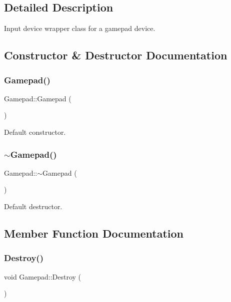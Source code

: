 \subsection{Detailed Description}
Input device wrapper class for a gamepad device. 

\subsection{Constructor \& Destructor Documentation}
\mbox{\label{class_gamepad_a766fe5c4b0971cd755f7c930ede3c068}} 
\subsubsection{\texorpdfstring{Gamepad()}{Gamepad()}}
{\footnotesize\ttfamily Gamepad\+::\+Gamepad (\begin{DoxyParamCaption}{ }\end{DoxyParamCaption})}

Default constructor. \mbox{\label{class_gamepad_a5d488c36c656a0f52787671b9b156822}} 
\subsubsection{\texorpdfstring{$\sim$\+Gamepad()}{~Gamepad()}}
{\footnotesize\ttfamily Gamepad\+::$\sim$\+Gamepad (\begin{DoxyParamCaption}{ }\end{DoxyParamCaption})}

Default destructor. 

\subsection{Member Function Documentation}
\mbox{\label{class_gamepad_ad37c0c811ab6d486c64a27ec518d8ec9}} 
\subsubsection{\texorpdfstring{Destroy()}{Destroy()}}
{\footnotesize\ttfamily void Gamepad\+::\+Destroy (\begin{DoxyParamCaption}{ }\end{DoxyParamCaption})}

